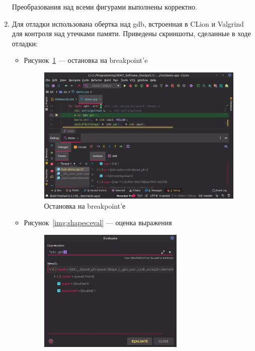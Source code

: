 \documentclass[a4paper, 14pt]{extarticle}
\begin{document}
\begin{enumerate}
    Преобразования над всеми фигурами выполнены корректно.

    \item Для отладки использована обертка над gdb, встроенная в CLion и Valgrind для контроля над утечками памяти.
    Приведены скриншоты, сделанные в ходе отладки:
    \begin{itemize}
        \item Рисунок~\ref{img:shapes:breakpoint} --- остановка на breakpoint'e
        \begin{figure}[h]
            \centering
            \includegraphics[width=\textwidth]{./img/S003.jpg}
            \caption{Остановка на breakpoint'е}%
            \label{img:shapes:breakpoint}
        \end{figure}
        \item Рисунок~\ref{img:shapes:eval} --- оценка выражения
        \begin{figure}[h]
            \centering
            \includegraphics[width=0.7\textwidth]{./img/S004.jpg}

\end{figure}
\end{itemize}
\end{enumerate}
\end{document}
